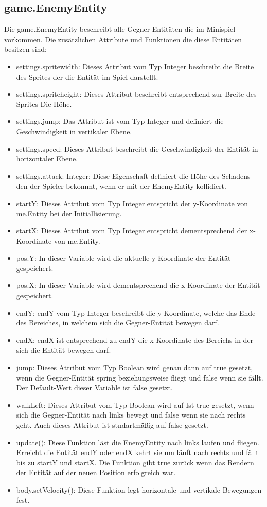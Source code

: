 \subsection{game.EnemyEntity}
\label{EnemyEntity}    
Die game.EnemyEntity beschreibt alle Gegner-Entit\"aten die im Minispiel vorkommen.
Die zus\"atzlichen Attribute und Funktionen die diese Entit\"aten besitzen sind:
\begin{itemize} 
	\item settings.spritewidth: Dieses Attribut vom Typ Integer beschreibt die Breite des Sprites der die Entit\"at im Spiel darstellt.
	\item settings.spriteheight: Dieses Attribut beschreibt entsprechend zur Breite des Sprites Die  H\"ohe.
	\item settings.jump: Das Attribut ist vom Typ Integer und definiert die Geschwindigkeit in vertikaler Ebene.
	\item settings.speed: Dieses Attribut beschreibt die Geschwindigkeit der Entit\"at in horizontaler Ebene.
	\item settings.attack: Integer: Diese Eigenschaft definiert die H\"ohe des Schadens den der Spieler bekommt, wenn er mit der EnemyEntity kollidiert.
	\item startY: Dieses Attribut vom Typ Integer entspricht der y-Koordinate von me.Entity bei der Initiallisierung.
	\item startX: Dieses Attribut vom Typ Integer entspricht dementsprechend der x-Koordinate von me.Entity.
	\item pos.Y: In dieser Variable wird die aktuelle y-Koordinate der Entit\"at gespeichert.
	\item pos.X: In dieser Variable wird dementsprechend die x-Koordinate der Entit\"at gespeichert.
	\item endY: endY vom Typ Integer beschreibt die y-Koordinate, welche das Ende des Bereiches, in welchem sich die Gegner-Entit\"at bewegen darf.
	\item endX: endX ist entsprechend zu endY die x-Koordinate des Bereichs in der sich die Entit\"at bewegen darf.
	\item jump: Dieses Attribut vom Typ Boolean wird genau dann auf true gesetzt, wenn die Gegner-Entit\"at spring beziehungsweise fliegt und false wenn 
		sie f\"allt. Der Default-Wert dieser Variable ist false gesetzt.
	\item walkLeft: Dieses Attribut vom Typ Boolean wird auf Ist true gesetzt, wenn sich die Gegner-Entit\"at nach links bewegt und false wenn sie 
		nach rechts geht. Auch dieses Attribut ist stndartm\"a{\ss}ig auf false gesetzt. 
	\item update(): Diese Funktion l\"ast die EnemyEntity nach links laufen und fliegen. Erreicht die Entit\"at endY oder endX kehrt sie um l\"auft nach 
		rechts und f\"allt bis zu startY und startX. Die Funktion gibt true zur\"uck wenn das Rendern der Entit\"at auf der neuen Position erfolgreich war.
	\item body.setVelocity(): Diese Funktion legt horizontale und vertikale Bewegungen fest.
\end{itemize}  


